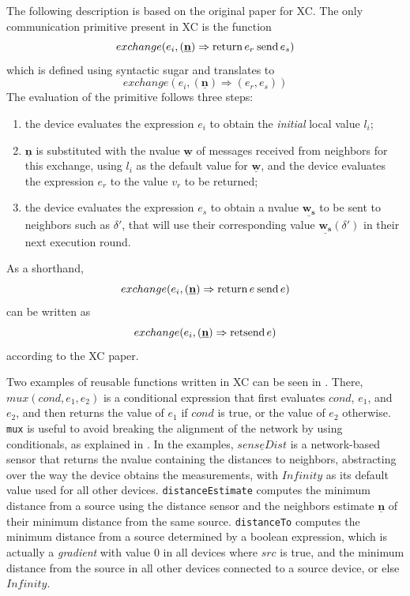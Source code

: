 The following description is based on the original paper for \ac{XC}\cite{xc}.
%
The only communication primitive present in \ac{XC} is the function $$exchange(e_i, (\underline{\mathbf{n}}) \Rightarrow \mathbf{\operatorname{return\,}} e_r \mathbf{\operatorname{\:send\,}} e_s)$$ which is defined using syntactic sugar and translates to $$exchange(e_i, (\underline{\mathbf{n}}) \Rightarrow (e_r, e_s))$$
%
The evaluation of the primitive follows three steps:
\begin{enumerate}
    \item the device evaluates the expression $e_i$ to obtain the \textit{initial} local value $l_i$;
    \item $\underline{\mathbf{n}}$ is substituted with the nvalue $\underline{\mathbf{w}}$ of messages received from neighbors for this exchange, using $l_i$ as the default value for $\underline{\mathbf{w}}$, and the device evaluates the expression $e_r$ to the value $v_r$ to be returned;
    \item the device evaluates the expression $e_s$ to obtain a nvalue $\underline{\mathbf{w_s}}$ to be sent to neighbors such as $\delta'$, that will use their corresponding value $\underline{\mathbf{w_s}}(\delta')$ in their next execution round.
\end{enumerate}

As a shorthand, $$exchange(e_i, (\underline{\mathbf{n}}) \Rightarrow \mathbf{\operatorname{return\,}} e \mathbf{\operatorname{\:send\,}} e)$$ can be written as $$exchange(e_i, (\underline{\mathbf{n}}) \Rightarrow \mathbf{\operatorname{retsend\,}} e)$$ according to the \ac{XC} paper\cite{xc}.

Two examples of reusable functions written in \ac{XC} can be seen in .
%
There, $mux(cond, e_1, e_2)$ is a conditional expression that first evaluates $cond$, $e_1$, and $e_2$, and then returns the value of $e_1$ if $cond$ is true, or the value of $e_2$ otherwise.
%
\texttt{mux} is useful to avoid breaking the alignment of the network by using conditionals, as explained in .
%
In the examples, $\underline{senseDist}$ is a network-based sensor that returns the nvalue containing the distances to neighbors, abstracting over the way the device obtains the measurements, with $Infinity$ as its default value used for all other devices.
%
\texttt{distanceEstimate} computes the minimum distance from a source using the distance sensor and the neighbors estimate $\underline{\mathbf{n}}$ of their minimum distance from the same source.
%
\texttt{distanceTo} computes the minimum distance from a source determined by a boolean expression, which is actually a \textit{gradient} with value $0$ in all devices where $src$ is true, and the minimum distance from the source in all other devices connected to a source device, or else $Infinity$.

